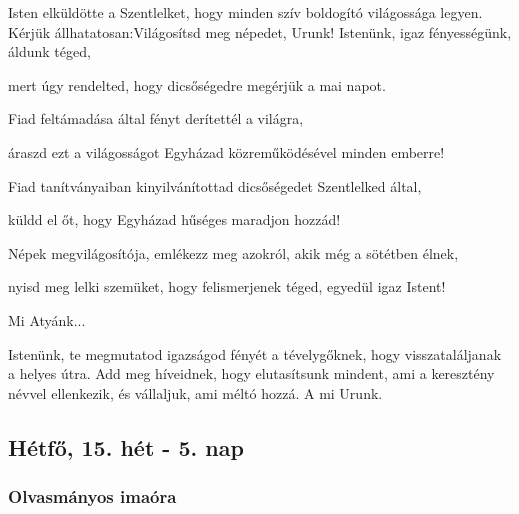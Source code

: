 \documentclass[twoside]{article}
\begin{document}






\begin{preces}{Isten elküldötte a Szentlelket, hogy minden szív boldogító világossága legyen. Kérjük állhatatosan:}{Világosítsd meg népedet, Urunk!}
  Istenünk, igaz fényességünk, áldunk téged,

  \reddash mert úgy rendelted, hogy dicsőségedre megérjük a mai napot.

  Fiad feltámadása által fényt derítettél a világra,

  \reddash áraszd ezt a világosságot Egyházad közreműködésével minden emberre!

  Fiad tanítványaiban kinyilvánítottad dicsőségedet Szentlelked által,

  \reddash küldd el őt, hogy Egyházad hűséges maradjon hozzád!

  Népek megvilágosítója, emlékezz meg azokról, akik még a sötétben élnek,

  \reddash nyisd meg lelki szemüket, hogy felismerjenek téged, egyedül igaz Istent!
\end{preces}
Mi Atyánk...

\label{DXV/L/Coll}

Istenünk, te megmutatod igazságod fényét a tévelygőknek, hogy visszataláljanak a helyes útra. Add meg híveidnek, hogy elutasítsunk mindent, ami a keresztény névvel ellenkezik, és vállaljuk, ami méltó hozzá. A mi Urunk.


\subsection*{Hétfő, 15. hét - 5. nap}


\subsubsection*{Olvasmányos imaóra}
\end{document}
